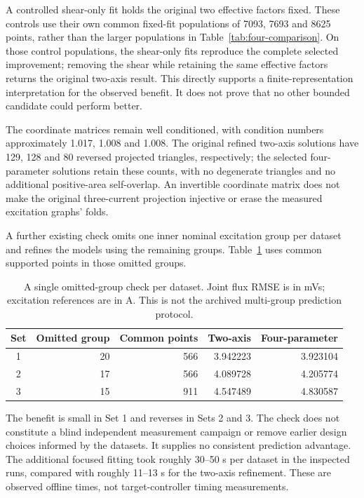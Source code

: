 A controlled shear-only fit holds the original two effective factors fixed. These controls use their own common fixed-fit populations of 7093, 7693 and 8625 points, rather than the larger populations in Table~\ref{tab:four-comparison}. On those control populations, the shear-only fits reproduce the complete selected improvement; removing the shear while retaining the same effective factors returns the original two-axis result. This directly supports a finite-representation interpretation for the observed benefit. It does not prove that no other bounded candidate could perform better.

The coordinate matrices remain well conditioned, with condition numbers approximately 1.017, 1.008 and 1.008. The original refined two-axis solutions have 129, 128 and 80 reversed projected triangles, respectively; the selected four-parameter solutions retain these counts, with no degenerate triangles and no additional positive-area self-overlap. An invertible coordinate matrix does not make the original three-current projection injective or erase the measured excitation graphs' folds.

A further existing check omits one inner nominal excitation group per dataset and refines the models using the remaining groups. Table~\ref{tab:four-holdout} uses common supported points in those omitted groups.
\begin{table}[htbp]\centering\small
\caption{A single omitted-group check per dataset. Joint flux RMSE is in mVs; excitation references are in A. This is not the archived multi-group prediction protocol.}\label{tab:four-holdout}
\begin{tabular}{crrrr}
\toprule
Set & Omitted group & Common points & Two-axis & Four-parameter\\
\midrule
1 & 20 & 566 & 3.942223 & 3.923104\\
2 & 17 & 566 & 4.089728 & 4.205774\\
3 & 15 & 911 & 4.547489 & 4.830587\\
\bottomrule
\end{tabular}
\end{table}
The benefit is small in Set 1 and reverses in Sets 2 and 3. The check does not constitute a blind independent measurement campaign or remove earlier design choices informed by the datasets. It supplies no consistent prediction advantage. The additional focused fitting took roughly 30--50 s per dataset in the inspected runs, compared with roughly 11--13 s for the two-axis refinement. These are observed offline times, not target-controller timing measurements.

